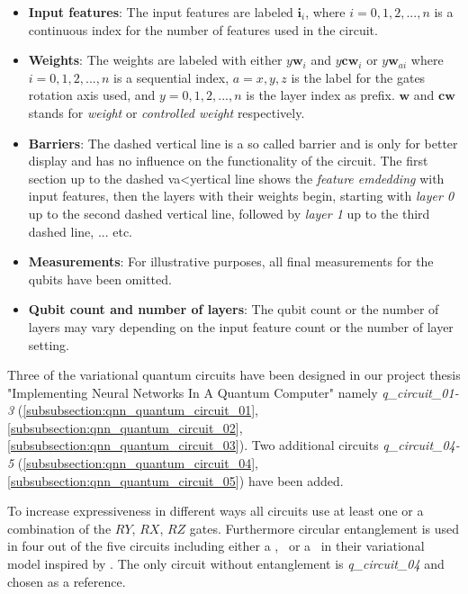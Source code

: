 \begin{itemize}
  \item \textbf{Input features}: The input features are labeled $\mathbf{i}_i$, where $i = 0,1,2,...,n$ is a continuous index for the number of features used in the circuit.
  \item \textbf{Weights}: The weights are labeled with either $y\mathbf{w}_i$ and $y\mathbf{cw}_i$ or $y\mathbf{w}_{ai}$ where $i = 0,1,2,...,n$ is a sequential index, $a = x,y,z$ is the label for the gates rotation axis used, and $y = 0,1,2,...,n$ is the layer index as prefix. $\mathbf{w}$ and $\mathbf{cw}$ stands for \textit{weight} or \textit{controlled weight} respectively.
  \item \textbf{Barriers}: The dashed vertical line is a so called barrier and is only for better display and has no influence on the functionality of the circuit. The first section up to the dashed va<yertical line shows the \textit{feature emdedding} with input features, then the layers with their weights begin, starting with \textit{layer 0} up to the second dashed vertical line, followed by \textit{layer 1} up to the third dashed line, ... etc.
  \item \textbf{Measurements}: For illustrative purposes, all final measurements for the qubits have been omitted.
  \item \textbf{Qubit count and number of layers}: The qubit count or the number of layers may vary depending on the input feature count or the number of layer setting.
\end{itemize}

Three of the variational quantum circuits have been designed in our project thesis "Implementing Neural Networks In A Quantum Computer" \cite{monteirosimoesImplementingNeuralNetworks2021} namely \textit{q\_circuit\_01-3} (\ref{subsubsection:qnn_quantum_circuit_01}, \ref{subsubsection:qnn_quantum_circuit_02}, \ref{subsubsection:qnn_quantum_circuit_03}). Two additional circuits \textit{q\_circuit\_04-5} (\ref{subsubsection:qnn_quantum_circuit_04}, \ref{subsubsection:qnn_quantum_circuit_05}) have been added.

To increase expressiveness in different ways\cite{sim_expressibility_2019} all circuits use at least one or a combination of the $RY$, $RX$, $RZ$ gates. Furthermore circular entanglement is used in four out of the five circuits including either a \cxgate, \czgate\ or a \crzgate\ in their variational model inspired by \cite{schuldCircuitcentricQuantumClassifiers2020}. The only circuit without entanglement is \textit{q\_circuit\_04} and chosen as a reference. 

